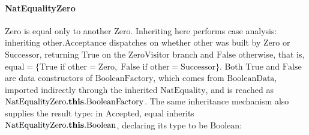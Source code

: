 \paragraph{NatEqualityZero}
$\mathrm{Zero}$ is equal only to another $\mathrm{Zero}$.
Inheriting here performs case analysis:
inheriting $\mathrm{other}.\mathrm{Acceptance}$ dispatches on whether $\mathrm{other}$
was built by $\mathrm{Zero}$ or $\mathrm{Successor}$, returning $\mathrm{True}$
on the $\mathrm{ZeroVisitor}$ branch and $\mathrm{False}$ otherwise, that is,
$\mathrm{equal} = \{ \mathrm{True} \text{ if } \mathrm{other} = \mathrm{Zero},\; \mathrm{False} \text{ if } \mathrm{other} = \mathrm{Successor} \}$.
Both $\mathrm{True}$ and $\mathrm{False}$ are data constructors of
$\mathrm{BooleanFactory}$, which comes from $\mathrm{BooleanData}$, imported
indirectly through the inherited $\mathrm{NatEquality}$, and is reached as
$\mathrm{NatEqualityZero}.\mathbf{this}.\mathrm{BooleanFactory}$.
The same inheritance mechanism also supplies the result type: in
$\mathrm{Accepted}$, $\mathrm{equal}$ inherits
$\mathrm{NatEqualityZero}.\mathbf{this}.\mathrm{Boolean}$, declaring its type to
be $\mathrm{Boolean}$:
